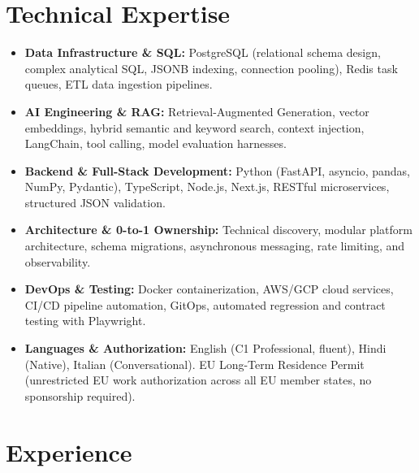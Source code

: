 \documentclass[10pt,a4paper]{article}
\begin{document}
\section{Technical Expertise}
\begin{itemize}
  \item \textbf{Data Infrastructure \& SQL:} PostgreSQL (relational schema design, complex analytical SQL, JSONB indexing, connection pooling), Redis task queues, ETL data ingestion pipelines.
  \item \textbf{AI Engineering \& RAG:} Retrieval-Augmented Generation, vector embeddings, hybrid semantic and keyword search, context injection, LangChain, tool calling, model evaluation harnesses.
  \item \textbf{Backend \& Full-Stack Development:} Python (FastAPI, asyncio, pandas, NumPy, Pydantic), TypeScript, Node.js, Next.js, RESTful microservices, structured JSON validation.
  \item \textbf{Architecture \& 0-to-1 Ownership:} Technical discovery, modular platform architecture, schema migrations, asynchronous messaging, rate limiting, and observability.
  \item \textbf{DevOps \& Testing:} Docker containerization, AWS/GCP cloud services, CI/CD pipeline automation, GitOps, automated regression and contract testing with Playwright.
  \item \textbf{Languages \& Authorization:} English (C1 Professional, fluent), Hindi (Native), Italian (Conversational). EU Long-Term Residence Permit (unrestricted EU work authorization across all EU member states, no sponsorship required).
\end{itemize}

\section{Experience}
\end{document}
